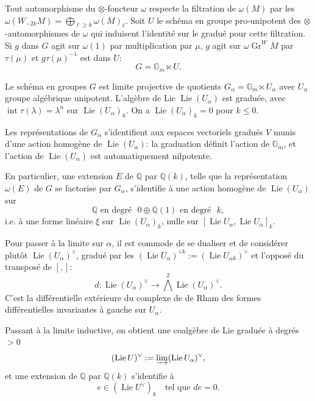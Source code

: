 \documentclass[12pt,a4paper]{article}
\theoremstyle{plain}
\theoremstyle{definition}
\theoremstyle{remark}
\DeclareMathOperator{\Lie}{Lie}
\DeclareMathOperator{\intt}{int}
\newcommand{\Q}{\mathbb{Q}}
\newcommand{\Gm}{\mathbb{G}_m}
\begin{document}
Tout automorphisme du $\otimes$-foncteur $\omega$ respecte la filtration de $\omega(M)$ par les $\omega(W_{-2k}M)=\bigoplus_{\ell\geq k}\omega(M)_\ell$. Soit $U$ le sch{\'e}ma en groupe pro-unipotent des $\otimes$-automorphismes de $\omega$ qui induisent l'identit{\'e} sur le gradu{\'e} pour cette filtration. Si $g$ dans $G$ agit sur $\omega(1)$ par multiplication par $\mu$, $g$ agit sur $\omega\operatorname{Gr}^W M$ par $\tau(\mu)$ et $g\tau(\mu)^{-1}$ est dans $U$:
\begin{equation*}
G = \Gm \ltimes U.
\end{equation*}

Le sch{\'e}ma en groupes $G$ est limite projective de quotients $G_\alpha=\Gm\ltimes U_\alpha$ avec $U_\alpha$ groupe alg{\'e}brique unipotent. L'alg{\`e}bre de Lie $\Lie(U_\alpha)$ est gradu{\'e}e, avec $\intt\tau(\lambda)=\lambda^n$ sur $\Lie(U_\alpha)_k$. On a $\Lie(U_\alpha)_k=0$ pour $k\leq 0$.

Les repr{\'e}sentations de $G_\alpha$ s'identifient aux espaces vectoriels gradu{\'e}s $V$ munis d'une action homog{\`e}ne de $\Lie(U_\alpha)$: la graduation d{\'e}finit l'action de $\Gm$, et l'action de $\Lie(U_\alpha)$ est automatiquement nilpotente.

En particulier, une extension $E$ de $\Q$ par $\Q(k)$, telle que la repr{\'e}sentation $\omega(E)$ de $G$ se factorise par $G_\alpha$, s'identifie {\`a} une action homog{\`e}ne de $\Lie(U_\alpha)$ sur
\begin{equation*}
\Q\text{ en degr{\'e} }0 \oplus \Q(1)\text{ en degr{\'e} }k,
\end{equation*}
i.e. {\`a} une forme lin{\'e}aire $\xi$ sur $\Lie(U_\alpha)_k$, nulle sur $[\Lie U_\alpha,\Lie U_\alpha]_k$.

Pour passer {\`a} la limite sur $\alpha$, il est commode de se dualiser et de consid{\'e}rer plut{\^o}t $\Lie(U_\alpha)^\vee$, gradu{\'e} par les $(\Lie U_\alpha)^{\vee k}:=(\Lie U_{\alpha k})^\vee$ et l'oppos{\'e} du transpos{\'e} de $[,]$:
\begin{equation*}
d : \Lie(U_\alpha)^\vee \longrightarrow \bigwedge^2\Lie(U_\alpha)^\vee.
\end{equation*}
C'est la diff{\'e}rentielle ext{\'e}rieure du complexe de de Rham des formes diff{\'e}rentielles invariantes {\`a} gauche sur $U_\alpha$.

Passant {\`a} la limite inductive, on obtient une coalg{\`e}bre de Lie gradu{\'e}e {\`a} degr{\'e}s $>0$
\begin{equation*}
(\Lie U)^\vee := \varinjlim(\Lie U_\alpha)^\vee,
\end{equation*}
et une extension de $\Q$ par $\Q(k)$ s'identifie {\`a}
\begin{equation*}
e\in(\Lie U^\vee)_k \quad \text{tel que }de=0.
\end{equation*}
\end{document}
